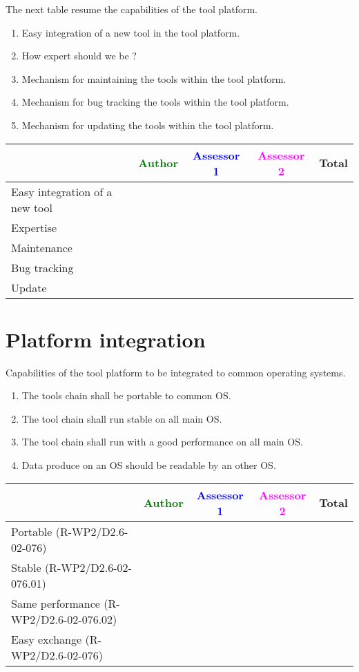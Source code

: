 The next table resume the capabilities of the tool platform.
\begin{enumerate}
\item Easy integration of a new tool in the tool platform.
\item How expert should we be ?
\item Mechanism for maintaining the tools within the tool platform.
\item Mechanism for bug tracking the tools within the tool platform.
\item Mechanism for updating the tools within the tool platform.
\end{enumerate}

\begin{tabular}{|l | c | c | c | c|}
\hline
& \textcolor{green}{Author} & \textcolor{blue}{Assessor 1} & \textcolor{magenta}{Assessor 2} & Total \\
\hline Easy integration of a new tool &
  &                 &                  &\\
\hline Expertise &
  &                 &                  &\\
\hline Maintenance &
  &                 &                  &\\
\hline Bug tracking &
  &                 &                  &\\
\hline Update &
  &                 &                  &\\
\hline
\end{tabular}

\section{Platform integration}
Capabilities of the tool platform to  be integrated to common operating systems.
\begin{enumerate}
\item  The tools chain shall be portable to common \gls{OS}.
\item   The tool chain shall run stable on all main \gls{OS}.
\item  The tool chain shall run with a good performance on all main \gls{OS}.
\item  Data produce on an \gls{OS} should be readable by an other \gls{OS}.
\end{enumerate}
\begin{tabular}{|l | c | c | c | c|}
  \hline
  & \textcolor{green}{Author} & \textcolor{blue}{Assessor 1} &  \textcolor{magenta}{Assessor 2} & Total \\
  \hline  Portable (R-WP2/D2.6-02-076) &
  &                 &                  &\\
  \hline   Stable (R-WP2/D2.6-02-076.01)&
  &                 &                  &\\
  \hline   Same performance (R-WP2/D2.6-02-076.02)&
  &                 &                  &\\
  \hline  Easy exchange (R-WP2/D2.6-02-076)&
  &                 &                  &\\
  \hline
\end{tabular}


